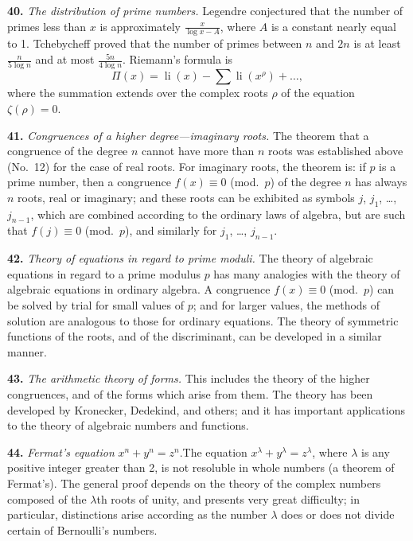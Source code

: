 \documentclass[11pt,a4paper]{book}
\begin{document}
\textbf{40.}\quad
\textit{The distribution of prime numbers.} Legendre conjectured that the number of primes less than $x$ is approximately $\frac{x}{\log x - A}$, where $A$ is a constant nearly equal to 1. Tchebycheff proved that the number of primes between $n$ and $2n$ is at least $\frac{n}{5\log n}$ and at most $\frac{5n}{4\log n}$. Riemann's formula is
\[
\Pi(x) = \operatorname{li}(x) - \sum \operatorname{li}(x^{\rho}) + \ldots,
\]
where the summation extends over the complex roots $\rho$ of the equation $\zeta(\rho) = 0$.

\textbf{41.}\quad
\textit{Congruences of a higher degree---imaginary roots.} The theorem that a congruence of the degree $n$ cannot have more than $n$ roots was established above (No.~12) for the case of real roots. For imaginary roots, the theorem is: if $p$ is a prime number, then a congruence $f(x) \equiv 0$ (mod.\ $p$) of the degree $n$ has always $n$ roots, real or imaginary; and these roots can be exhibited as symbols $j$, $j_{1}$, \ldots, $j_{n-1}$, which are combined according to the ordinary laws of algebra, but are such that $f(j) \equiv 0$ (mod.\ $p$), and similarly for $j_{1}$, \ldots, $j_{n-1}$.

\textbf{42.}\quad
\textit{Theory of equations in regard to prime moduli.} The theory of algebraic equations in regard to a prime modulus $p$ has many analogies with the theory of algebraic equations in ordinary algebra. A congruence $f(x) \equiv 0$ (mod.\ $p$) can be solved by trial for small values of $p$; and for larger values, the methods of solution are analogous to those for ordinary equations. The theory of symmetric functions of the roots, and of the discriminant, can be developed in a similar manner.

\textbf{43.}\quad
\textit{The arithmetic theory of forms.} This includes the theory of the higher congruences, and of the forms which arise from them. The theory has been developed by Kronecker, Dedekind, and others; and it has important applications to the theory of algebraic numbers and functions.

\textbf{44.}\quad
\textit{Fermat's equation} $x^{n} + y^{n} = z^{n}$.\quad The equation $x^{\lambda} + y^{\lambda} = z^{\lambda}$, where $\lambda$ is any positive integer greater than 2, is not resoluble in whole numbers (a theorem of Fermat's). The general proof depends on the theory of the complex numbers composed of the $\lambda$th roots of unity, and presents very great difficulty; in particular, distinctions arise according as the number $\lambda$ does or does not divide certain of Bernoulli's numbers.
\end{document}
